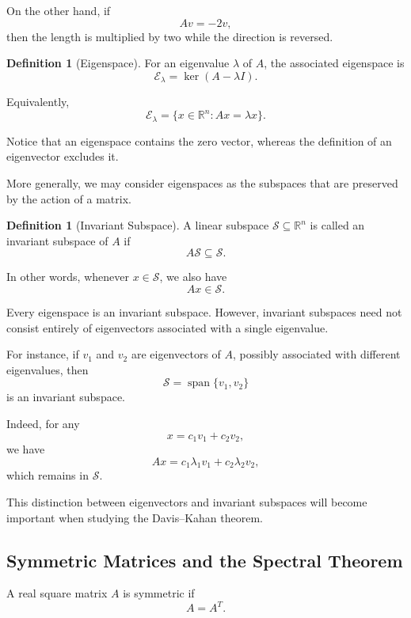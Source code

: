\documentclass[14pt,letterpaper]{article}
\theoremstyle{plain}
\theoremstyle{definition}
\newtheorem{definition}[theorem]{Definition}
\theoremstyle{remark}
\newcommand{\R}{\mathbb{R}}
\DeclareMathOperator{\Span}{span}
\begin{document}
On the other hand, if
\[
Av=-2v,
\]
then the length is multiplied by two while
the direction is reversed.

\begin{definition}[Eigenspace]
For an eigenvalue $\lambda$ of $A$, the associated
eigenspace is
\[
\boxed{
\mathcal E_{\lambda}
=
\ker(A-\lambda I).
}
\]

Equivalently,
\[
\mathcal E_{\lambda}
=
\{x\in\R^n:Ax=\lambda x\}.
\]
\end{definition}

Notice that an eigenspace contains the zero vector,
whereas the definition of an eigenvector excludes it.

More generally, we may consider eigenspaces as the subspaces that are
preserved by the action of a matrix.

\begin{definition}[Invariant Subspace]
A linear subspace $\mathcal S\subseteq\R^n$ is called
an invariant subspace of $A$ if
\[
\boxed{
A\mathcal S\subseteq\mathcal S.
}
\]

In other words, whenever $x\in\mathcal S$, we also have
\[
Ax\in\mathcal S.
\]
\end{definition}

Every eigenspace is an invariant subspace.
However, invariant subspaces need not consist
entirely of eigenvectors associated with a single
eigenvalue.

For instance, if $v_1$ and $v_2$ are eigenvectors
of $A$, possibly associated with different eigenvalues,
then
\[
\mathcal S=\Span\{v_1,v_2\}
\]
is an invariant subspace.

Indeed, for any
\[
x=c_1v_1+c_2v_2,
\]
we have
\[
Ax=c_1\lambda_1v_1+c_2\lambda_2v_2,
\]
which remains in $\mathcal S$.

This distinction between eigenvectors and invariant
subspaces will become important when studying
the Davis--Kahan theorem.


\subsection{Symmetric Matrices and the Spectral Theorem}
\label{subsec:spectral_background}

A real square matrix $A$ is symmetric if
\[
\boxed{A=A^T.}
\]
\end{document}
